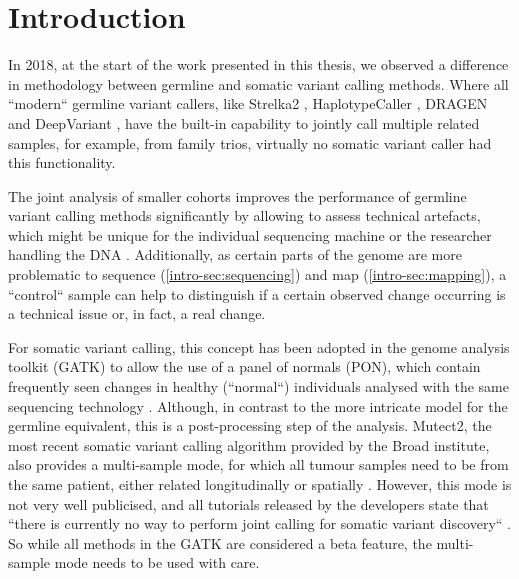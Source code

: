 \section{Introduction}
\label{variantcalling-sec:intro}
In 2018, at the start of the work presented in this thesis, we observed a difference in methodology  between germline and somatic variant calling methods. Where all ``modern`` germline variant callers, like Strelka2 \cite{Kim2018}, HaplotypeCaller \cite{Poplin2017}, DRAGEN \cite{Miller2015} and DeepVariant \cite{Poplin2018},  have the built-in capability to jointly call multiple related samples, for example, from family trios, virtually no somatic variant caller had this functionality. 

The joint analysis of smaller cohorts improves the performance of germline variant calling methods significantly by allowing to assess technical artefacts, which might be unique for the individual sequencing machine or the researcher handling the DNA \cite{Schirmer2016,Stoler2021}. Additionally, as certain parts of the genome are more problematic to sequence (\autoref{intro-sec:sequencing}) and map (\autoref{intro-sec:mapping}), a ``control`` sample can help to distinguish if a certain observed change  occurring  is a technical issue or, in fact, a real change.

For somatic variant calling, this concept has been adopted  in the genome analysis toolkit (GATK) \cite{BrianOConnor2020} to allow the use of a panel of normals (PON), which contain frequently seen changes in healthy (``normal``) individuals analysed with the same sequencing technology \cite{GATKTeam2021}. Although, in contrast to the  more intricate model for the germline equivalent, this is a post-processing step of the analysis. Mutect2,  the most recent somatic variant calling algorithm provided by the Broad institute, also provides a multi-sample mode, for which all tumour samples need to be from the same patient, either related longitudinally or spatially \cite{GATKTeam2020}. However, this mode is not very well publicised, and all tutorials released by the developers state that ``there is currently no way to perform joint calling for somatic variant discovery`` \cite{GATKTeam2021a}. So while all methods in the GATK are considered a beta feature, the multi-sample mode needs to be used with care.

